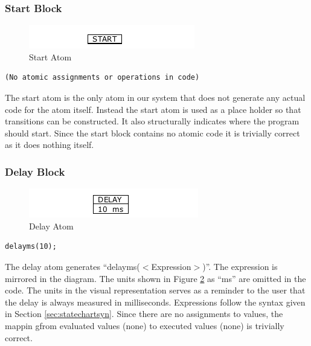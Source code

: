 \subsubsection{Start Block}

\begin{figure}[h]
	\centering
	\includegraphics[width=\imgmedphoto]{./images/correctness_atom_start.png}
	\caption{Start Atom}
	\label{fig:correctness_atom_start}
\end{figure}

\begin{lstlisting}[frame=single]
(No atomic assignments or operations in code)
\end{lstlisting}

The start atom is the only atom in our system that does not generate any actual 
code for the atom itself. Instead the start atom is used as a place holder so that 
transitions can be constructed. It also structurally indicates where the program 
should start. Since the start block contains no atomic code it is trivially correct 
as it does nothing itself.


\subsubsection{Delay Block}

\begin{figure}[h]
	\centering
	\includegraphics[width=\imgmedphoto]{./images/correctness_atom_delay.png}
	\caption{Delay Atom}
	\label{fig:correctness_atom_delay}
\end{figure}

\begin{lstlisting}[frame=single]
delayms(10);
\end{lstlisting}

The delay atom generates ``delayms($<$Expression$>$)''. The expression is mirrored
in the diagram. The units shown in Figure \ref{fig:correctness_atom_delay} as ``ms'' 
are omitted in the code. The units in the visual representation serves as a reminder to the user 
that the delay is always measured in milliseconds. Expressions follow the syntax 
given in Section \ref{sec:statechartsyn}. Since there are no assignments to values,
the mappin gfrom evaluated values (none) to executed values (none) is trivially correct.


